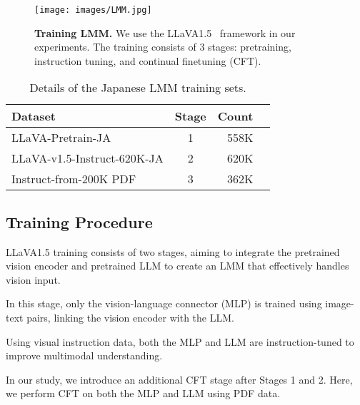 \begin{figure}[t]
  \centering
  \texttt{[image: images/LMM.jpg]}
  \vspace{-6mm}
  \caption{\textbf{Training LMM.} 
  We use the LLaVA1.5~\cite{llava1.5} framework in our experiments. 
  The training consists of 3 stages: pretraining, instruction tuning, and continual finetuning (CFT).}
  \label{fig:llava}
\end{figure}

\begin{table}[t] 
  \tabcolsep=0.15cm
    \begin{center}
    \vspace{-1mm}
        \begin{adjustbox}{width=0.83\linewidth}
        \begin{tabular}{@{}l|crr@{}}
            \toprule
            \textbf{Dataset} & \textbf{Stage} &  \textbf{Count} \\
            \midrule
            LLaVA-Pretrain-JA & 1 & 558K \\
            LLaVA-v1.5-Instruct-620K-JA & 2 & 620K \\
            Instruct-from-200K PDF & 3 & 362K \\ 
            \bottomrule
        \end{tabular}
        \end{adjustbox}
    \vspace{-2mm}
    \caption{Details of the Japanese LMM training sets.}
    \label{tab:traindata}
    \end{center}
\end{table} 

\subsection{Training Procedure}
LLaVA1.5 training consists of two stages, aiming to integrate the pretrained vision encoder and pretrained LLM to create an LMM that effectively handles vision input.

In this stage, only the vision-language connector (MLP) is trained using image-text pairs, linking the vision encoder with the LLM.

Using visual instruction data, both the MLP and LLM are instruction-tuned to improve multimodal understanding.

In our study, we introduce an additional CFT stage after Stages 1 and 2.
Here, we perform CFT on both the MLP and LLM using PDF data.


